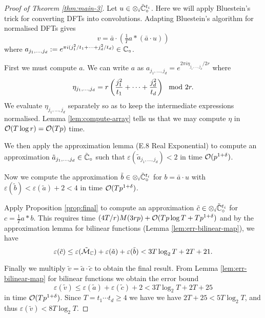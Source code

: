 \begin{proof}[Proof of Theorem \ref{thm:main-3}]
    Let $u \in \otimes_i \tilde{{\mathbb C}}_\circ^{t_i}$.
    Here we will apply Bluestein's trick for converting DFTs into convolutions. Adapting Bluestein's algorithm for normalised DFTs gives
    \[
        v = \bar{a} \cdot (\tfrac{1}{T}a \ast (\bar{a} \cdot u))
    \]
    where $a_{j_1, \ldots, j_d} := e^{\pi i (j_1^2 / t_1 + \cdots + j_d^2 / t_d)} \in {\mathbb C}_\circ$.


    First we must compute $a$. We can write $a$ as $a_{j_1, \ldots, j_d} = e^{2\pi i \eta_{j_1, \ldots, j_d}/2r}$ where
    \[
        \eta_{j_1, \ldots, j_d} = r\left(\frac{j_1^2}{t_1} + \cdots + \frac{j_d^2}{t_d}\right) \mod 2r.
    \]
    We evaluate $\eta_{j_1, \ldots, j_d}$ separately so as to keep the intermediate expressions normalised. Lemma \ref{lem:compute-array} tells us that we may compute $\eta$ in $\mathcal O(T \log r) = \mathcal O(T p)$ time. 


    We then apply the approximation lemma (E.8 Real Exponential) to compute an approximation $\tilde{a}_{j_1, \ldots, j_d} \in \tilde{{\mathbb C}}_\circ$ such that $\varepsilon(\tilde{a}_{j_1, \ldots, j_d}) < 2$ in time $\mathcal O(p^{1 + \delta})$.

    Now we compute the approximation $\tilde{b} \in \otimes_i \tilde{{\mathbb C}}^{t_i}_\circ$ for $b = \bar{a} \cdot u$ with $\varepsilon(\tilde{b}) < \varepsilon(\tilde{a}) + 2 < 4$ in time $\mathcal O(T p^{1 + \delta})$.

    Apply Proposition \ref{prop:final} to compute an approximation $\tilde{c} \in \otimes_i \tilde{{\mathbb C}}^{t_i}_\circ$ for $c = \tfrac{1}{T} a \ast b$. This requires time $(4T/r)M(3rp) + \mathcal O(Tp\log T + Tp^{1 + \delta})$ and by the approximation lemma for bilinear functions (Lemma \ref{lem:err-bilinear-map}), we have
    \[
        \varepsilon(\tilde{c}) \le \varepsilon(\tilde{\mathcal M}_{\mathbb C}) + \varepsilon(\tilde{a}) + \varepsilon(\tilde{b}) < 3T\log_2 T + 2T + 21.
    \]

    Finally we multiply $\tilde{v} = \tilde{a} \cdot \tilde{c}$ to obtain the final result. From Lemma \ref{lem:err-bilinear-map} for bilinear functions we obtain the error bound
    \[
        \varepsilon(\tilde{v}) \le \varepsilon(\tilde{a}) + \varepsilon(\tilde{c}) + 2 < 3 T \log_2 T + 2T + 25
    \]
    in time $\mathcal O(Tp^{1 + \delta})$. Since $T = t_1\cdots t_d \ge 4$ we have we have $2T + 25 < 5T \log_2 T$, and thus $\varepsilon(\tilde{v}) < 8T\log_2 T$.
\end{proof}

